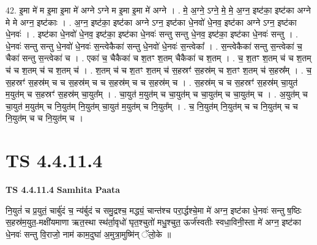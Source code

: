 \documentclass[17pt]{extarticle}
\begin{document}
42. इ॒मा मे॑ म इ॒मा इ॒मा मे॑ अग्ने ऽग्ने म इ॒मा इ॒मा मे॑ अग्ने । . मे॒ अ॒ग्ने॒ ऽग्ने॒ मे॒ मे॒ अ॒ग्न॒ इष्ट॑का॒ इष्ट॑का अग्ने मे मे अग्न॒ इष्ट॑काः । . अ॒ग्न॒ इष्ट॑का॒ इष्ट॑का अग्ने ऽग्न॒ इष्ट॑का धे॒नवो॑ धे॒नव॒ इष्ट॑का अग्ने ऽग्न॒ इष्ट॑का धे॒नवः॑ । . इष्ट॑का धे॒नवो॑ धे॒नव॒ इष्ट॑का॒ इष्ट॑का धे॒नवः॑ सन्तु सन्तु धे॒नव॒ इष्ट॑का॒ इष्ट॑का धे॒नवः॑ सन्तु । . धे॒नवः॑ सन्तु सन्तु धे॒नवो॑ धे॒नवः॑ स॒न्त्वेकैका॑ सन्तु धे॒नवो॑ धे॒नवः॑ स॒न्त्वेका᳚ । . स॒न्त्वेकैका॑ सन्तु स॒न्त्वेका॑ च॒ चैका॑ सन्तु स॒न्त्वेका॑ च । . एका॑ च॒ चैकैका॑ च श॒तꣳ श॒तम् चैकैका॑ च श॒तम् । . च॒ श॒तꣳ श॒तम् च॑ च श॒तम् च॑ च श॒तम् च॑ च श॒तम् च॑ । . श॒तम् च॑ च श॒तꣳ श॒तम् च॑ स॒हस्रꣳ॑ स॒हस्र॑म् च श॒तꣳ श॒तम् च॑ स॒हस्र᳚म् । . च॒ स॒हस्रꣳ॑ स॒हस्र॑म् च च स॒हस्र॑म् च च स॒हस्र॑म् च च स॒हस्र॑म् च । . स॒हस्र॑म् च च स॒हस्रꣳ॑ स॒हस्र॑म् चा॒युत॑ म॒युत॑म् च स॒हस्रꣳ॑ स॒हस्र॑म् चा॒युत᳚म् । . चा॒युत॑ म॒युत॑म् च चा॒युत॑म् च चा॒युत॑म् च चा॒युत॑म् च । . अ॒युत॑म् च चा॒युत॑ म॒युत॑म् च नि॒युत॑म् नि॒युत॑म् चा॒युत॑ म॒युत॑म् च नि॒युत᳚म् । . च॒ नि॒युत॑म् नि॒युत॑म् च च नि॒युत॑म् च च नि॒युत॑म् च च नि॒युत॑म् च । \newline
\pagebreak
{}

\section{ TS 4.4.11.4 }

\textbf{TS 4.4.11.4 } \newline
\textbf{Samhita Paata} \newline

नि॒युतं॑ च प्र॒युतं॒ चार्बु॑दं च॒ न्य॑र्बुदं च समु॒द्रश्च॒ मद्ध्यं॒ चान्त॑श्च परा॒र्द्धश्चे॒मा मे॑ अग्न॒ इष्ट॑का धे॒नवः॑ सन्तु ष॒ष्ठिः स॒हस्र॑म॒युत॒-मक्षी॑यमाणा ऋत॒स्था स्थ॑र्ता॒वृधो॑ घृत॒श्चुतो॑ मधु॒श्चुत॒ ऊर्ज॑स्वतीः स्वधा॒विनी॒स्ता मे॑ अग्न॒ इष्ट॑का धे॒नवः॑ सन्तु वि॒राजो॒ नाम॑ काम॒दुघा॑ अ॒मुत्रा॒मुष्मि॑न् ॅलो॒के ॥ \newline
\end{document}
